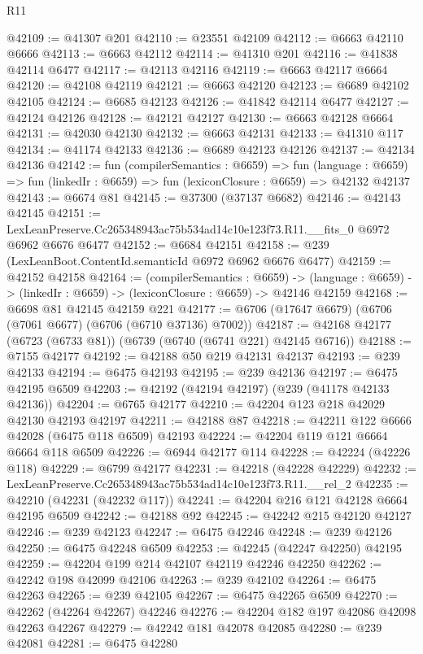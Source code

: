 \begin{lexlean}{R11}
\begin{coremodule}
@42109 := @41307 @201
@42110 := @23551 @42109
@42112 := @6663 @42110 @6666
@42113 := @6663 @42112
@42114 := @41310 @201
@42116 := @41838 @42114 @6477
@42117 := @42113 @42116
@42119 := @6663 @42117 @6664
@42120 := @42108 @42119
@42121 := @6663 @42120
@42123 := @6689 @42102 @42105
@42124 := @6685 @42123
@42126 := @41842 @42114 @6477
@42127 := @42124 @42126
@42128 := @42121 @42127
@42130 := @6663 @42128 @6664
@42131 := @42030 @42130
@42132 := @6663 @42131
@42133 := @41310 @117
@42134 := @41174 @42133
@42136 := @6689 @42123 @42126
@42137 := @42134 @42136
@42142 := fun (compilerSemantics : @6659) =>
  fun (language : @6659) => fun (linkedIr : @6659) => fun (lexiconClosure : @6659) => @42132 @42137
@42143 := @6674 @81
@42145 := @37300 (@37137 @6682)
@42146 := @42143 @42145
@42151 := LexLeanPreserve.Cc265348943ac75b534ad14c10e123f73.R11.__fits_0 @6972 @6962 @6676 @6477
@42152 := @6684 @42151
@42158 := @239 (LexLeanBoot.ContentId.semanticId @6972 @6962 @6676 @6477)
@42159 := @42152 @42158
@42164 := (compilerSemantics : @6659) ->
  (language : @6659) -> (linkedIr : @6659) -> (lexiconClosure : @6659) -> @42146 @42159
@42168 := @6698 @81 @42145 @42159 @221
@42177 := @6706 (@17647 @6679) (@6706 (@7061 @6677) (@6706 (@6710 @37136) @7002))
@42187 := @42168 @42177 (@6723 (@6733 @81)) (@6739 (@6740 (@6741 @221) @42145 @6716))
@42188 := @7155 @42177
@42192 := @42188 @50 @219 @42131 @42137
@42193 := @239 @42133
@42194 := @6475 @42193
@42195 := @239 @42136
@42197 := @6475 @42195 @6509
@42203 := @42192 (@42194 @42197) (@239 (@41178 @42133 @42136))
@42204 := @6765 @42177
@42210 := @42204 @123 @218 @42029 @42130 @42193 @42197
@42211 := @42188 @87
@42218 := @42211 @122 @6666 @42028 (@6475 @118 @6509) @42193
@42224 := @42204 @119 @121 @6664 @6664 @118 @6509
@42226 := @6944 @42177 @114
@42228 := @42224 (@42226 @118)
@42229 := @6799 @42177
@42231 := @42218 (@42228 @42229)
@42232 := LexLeanPreserve.Cc265348943ac75b534ad14c10e123f73.R11.__rel_2
@42235 := @42210 (@42231 (@42232 @117))
@42241 := @42204 @216 @121 @42128 @6664 @42195 @6509
@42242 := @42188 @92
@42245 := @42242 @215 @42120 @42127
@42246 := @239 @42123
@42247 := @6475 @42246
@42248 := @239 @42126
@42250 := @6475 @42248 @6509
@42253 := @42245 (@42247 @42250) @42195
@42259 := @42204 @199 @214 @42107 @42119 @42246 @42250
@42262 := @42242 @198 @42099 @42106
@42263 := @239 @42102
@42264 := @6475 @42263
@42265 := @239 @42105
@42267 := @6475 @42265 @6509
@42270 := @42262 (@42264 @42267) @42246
@42276 := @42204 @182 @197 @42086 @42098 @42263 @42267
@42279 := @42242 @181 @42078 @42085
@42280 := @239 @42081
@42281 := @6475 @42280

\end{coremodule}
\end{lexlean}
